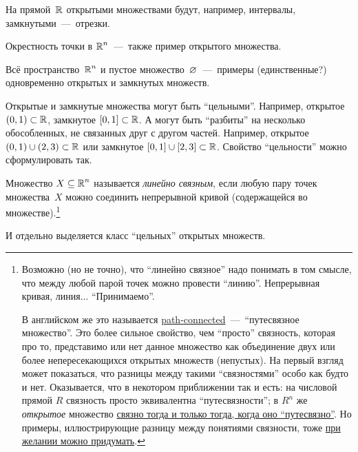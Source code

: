 \documentclass[a4paper,12pt]{article}
\begin{document}
  \begin{example}
    На прямой~$\operatorname{\mathbb R}$ открытыми множествами будут, например, интервалы, замкнутыми~---~отрезки.

    Окрестность точки в $\operatorname{\mathbb R}^n$~---~также пример открытого множества.

    Всё пространство~$\operatorname{\mathbb R}^n$ и пустое множество~$\varnothing$~---~примеры (единственные?) одновременно открытых и замкнутых множеств.
  \end{example}

  Открытые и замкнутые множества могут быть ``цельными''.
  Например, открытое $(0, 1) \hm\subset \RR$, замкнутое $[0, 1] \hm\subset \RR$.
  А могут быть ``разбиты'' на несколько обособленных, не связанных друг с другом частей.
  Например, открытое $(0, 1) \hm\cup (2, 3) \subset \RR$ или замкнутое $[0, 1] \hm\cup [2, 3] \subset \RR$.
  Свойство ``цельности'' можно сформулировать так.

  \begin{definition}
      Множество $X \hm\subseteq \RR^n$ называется \emph{линейно связным}, если любую пару точек множества~$X$ можно соединить непрерывной кривой (содержащейся во множестве).\footnote{
        Возможно (но не точно), что ``линейно связное'' надо понимать в том смысле, что между любой парой точек можно провести ``линию''.
        Непрерывная кривая, линия...
        ``Принимаемо''.
        
        В английском же это называется \href{https://en.wikipedia.org/wiki/Connected_space\#Path_connectedness}{path-connected}~---~``путесвязное множество''.
        Это более сильное свойство, чем ``просто'' связность, которая про то, представимо или нет данное множество как объединение двух или более непересекающихся открытых множеств (непустых).  %
        На первый взгляд может показаться, что разницы между такими ``связностями'' особо как будто и нет.
        Оказывается, что в некотором приближении так и есть: на числовой прямой $R$ связность просто эквивалентна ``путесвязности''; в $R^n$ же \emph{открытое} множество \href{https://en.wikipedia.org/wiki/Connected_space\#Path_connectedness}{связно тогда и только тогда, когда оно ``путесвязно''}.
        Но примеры, иллюстрирующие разницу между понятиями связности, тоже \href{https://w.wiki/DGXV}{при желании можно придумать}.
      }
  \end{definition}

  И отдельно выделяется класс ``цельных'' открытых множеств.
\end{document}
